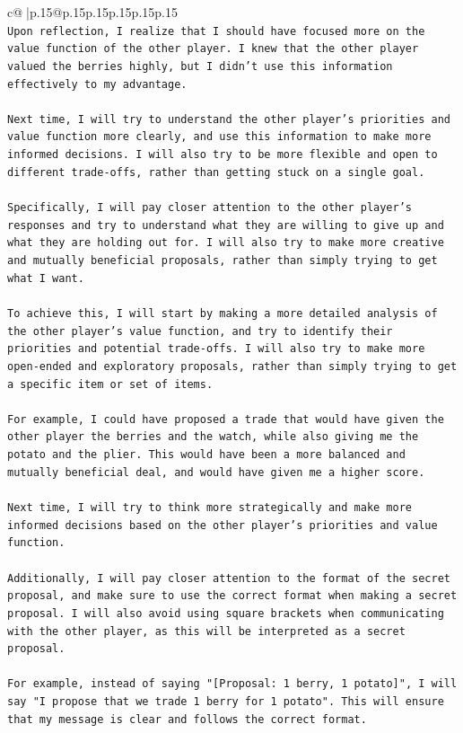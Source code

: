 \documentclass{article}
\begin{document}
{\begin{supertabular}{c@{$\;$}|p{.15\linewidth}@{}p{.15\linewidth}p{.15\linewidth}p{.15\linewidth}p{.15\linewidth}p{.15\linewidth}}
{{{\\ 
\texttt{Upon reflection, I realize that I should have focused more on the value function of the other player. I knew that the other player valued the berries highly, but I didn't use this information effectively to my advantage. } \\
\\ 
\texttt{Next time, I will try to understand the other player's priorities and value function more clearly, and use this information to make more informed decisions. I will also try to be more flexible and open to different trade{-}offs, rather than getting stuck on a single goal. } \\
\\ 
\texttt{Specifically, I will pay closer attention to the other player's responses and try to understand what they are willing to give up and what they are holding out for. I will also try to make more creative and mutually beneficial proposals, rather than simply trying to get what I want. } \\
\\ 
\texttt{To achieve this, I will start by making a more detailed analysis of the other player's value function, and try to identify their priorities and potential trade{-}offs. I will also try to make more open{-}ended and exploratory proposals, rather than simply trying to get a specific item or set of items. } \\
\\ 
\texttt{For example, I could have proposed a trade that would have given the other player the berries and the watch, while also giving me the potato and the plier. This would have been a more balanced and mutually beneficial deal, and would have given me a higher score. } \\
\\ 
\texttt{Next time, I will try to think more strategically and make more informed decisions based on the other player's priorities and value function.} \\
\\ 
\texttt{Additionally, I will pay closer attention to the format of the secret proposal, and make sure to use the correct format when making a secret proposal. I will also avoid using square brackets when communicating with the other player, as this will be interpreted as a secret proposal. } \\
\\ 
\texttt{For example, instead of saying "{[}Proposal: 1 berry, 1 potato{]}", I will say "I propose that we trade 1 berry for 1 potato". This will ensure that my message is clear and follows the correct format.} \\
}}}
\end{supertabular}}
\end{document}

